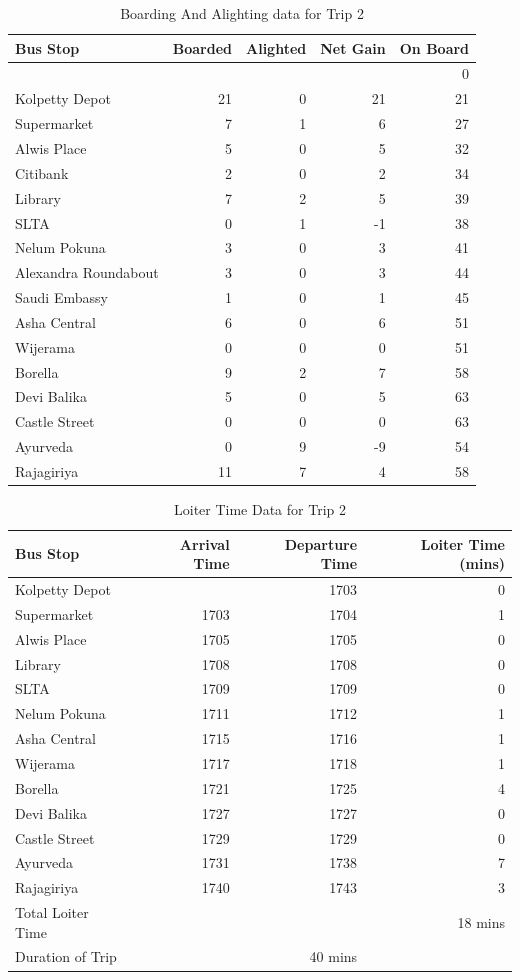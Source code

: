 \documentclass[12pt, oneside]{report}
\begin{document}
\begin{table}
\centering
\begin{tabular}{|l|r|r|r|r|}
\hline
Bus Stop & Boarded & Alighted & Net Gain & On Board \\
\hline
 & & & & 0 \\
Kolpetty Depot	&21	&0	&21	&21\\
Supermarket	&7	&1	&6	&27\\
Alwis Place	&5	&0	&5	&32\\
\rowcolor[gray]{0.7}
Citibank	&2	&0	&2	&34\\
Library	&7	&2	&5	&39\\
SLTA	&0	&1	&-1	&38\\
Nelum Pokuna	&3	&0	&3	&41\\
\rowcolor[gray]{0.7}
Alexandra Roundabout	&3	&0	&3	&44\\
\rowcolor[gray]{0.7}
Saudi Embassy	&1	&0	&1	&45\\
Asha Central	&6	&0	&6	&51\\
Wijerama	&0	&0	&0	&51\\
Borella	&9	&2	&7	&58\\
Devi Balika	&5	&0	&5	&63\\
Castle Street	&0	&0	&0	&63\\
Ayurveda	&0	&9	&-9	&54\\
Rajagiriya	&11	&7	&4	&58\\
\hline
\end{tabular}
\caption{Boarding And Alighting data for Trip 2}
\label{table-trip2-BoardingAndAlighting}
\end{table}

\begin{table}
\centering
\begin{tabular}{|l|r|r|r|}
\hline
Bus Stop & Arrival Time & Departure Time & Loiter Time (mins) \\
\hline
Kolpetty Depot	&	&1703	&0\\
Supermarket	&1703	&1704	&1\\
Alwis Place	&1705	&1705	&0\\
Library	&1708	&1708	&0\\
SLTA	&1709	&1709	&0\\
Nelum Pokuna	&1711	&1712	&1\\
Asha Central	&1715	&1716	&1\\
Wijerama	&1717	&1718	&1\\
Borella	&1721	&1725	&4\\
Devi Balika	&1727	&1727	&0\\
Castle Street	&1729	&1729	&0\\
Ayurveda	&1731	&1738	&7\\
Rajagiriya	&1740	&1743	&3\\
\hline
Total Loiter Time & & & 18 mins \\
Duration of Trip & & 40 mins & \\
\hline
\end{tabular}
\caption{Loiter Time Data for Trip 2}
\label{table-trip2-LoiterTime}
\end{table}
\end{document}
